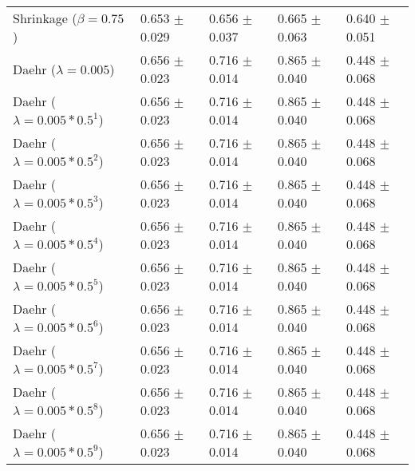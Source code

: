 \begin{table}
\begin{tabular}{*{5}{l}}
Shrinkage ($\beta=0.75$)&0.653 $\pm$ 0.029&0.656 $\pm$ 0.037&0.665 $\pm$ 0.063&0.640 $\pm$ 0.051\\
Daehr ($\lambda=0.005$)&0.656 $\pm$ 0.023&0.716 $\pm$ 0.014&0.865 $\pm$ 0.040&0.448 $\pm$ 0.068\\
Daehr ($\lambda=0.005*0.5^1$)&0.656 $\pm$ 0.023&0.716 $\pm$ 0.014&0.865 $\pm$ 0.040&0.448 $\pm$ 0.068\\
Daehr ($\lambda=0.005*0.5^2$)&0.656 $\pm$ 0.023&0.716 $\pm$ 0.014&0.865 $\pm$ 0.040&0.448 $\pm$ 0.068\\
Daehr ($\lambda=0.005*0.5^3$)&0.656 $\pm$ 0.023&0.716 $\pm$ 0.014&0.865 $\pm$ 0.040&0.448 $\pm$ 0.068\\
Daehr ($\lambda=0.005*0.5^4$)&0.656 $\pm$ 0.023&0.716 $\pm$ 0.014&0.865 $\pm$ 0.040&0.448 $\pm$ 0.068\\
Daehr ($\lambda=0.005*0.5^5$)&0.656 $\pm$ 0.023&0.716 $\pm$ 0.014&0.865 $\pm$ 0.040&0.448 $\pm$ 0.068\\
Daehr ($\lambda=0.005*0.5^6$)&0.656 $\pm$ 0.023&0.716 $\pm$ 0.014&0.865 $\pm$ 0.040&0.448 $\pm$ 0.068\\
Daehr ($\lambda=0.005*0.5^7$)&0.656 $\pm$ 0.023&0.716 $\pm$ 0.014&0.865 $\pm$ 0.040&0.448 $\pm$ 0.068\\
Daehr ($\lambda=0.005*0.5^8$)&0.656 $\pm$ 0.023&0.716 $\pm$ 0.014&0.865 $\pm$ 0.040&0.448 $\pm$ 0.068\\
Daehr ($\lambda=0.005*0.5^9$)&0.656 $\pm$ 0.023&0.716 $\pm$ 0.014&0.865 $\pm$ 0.040&0.448 $\pm$ 0.068\\
\bottomrule
\end{tabular}
\end{table}

